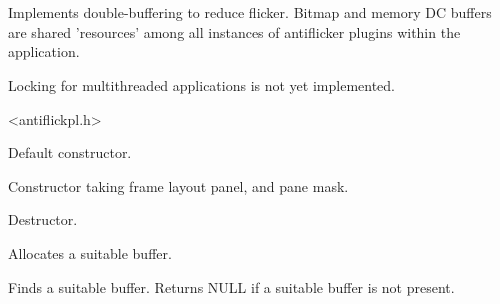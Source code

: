 %
%


\section{}\label{cbantiflickerplugin}


Implements double-buffering to reduce flicker.
Bitmap and memory DC buffers are shared 'resources' among all instances of
antiflicker plugins within the application.

Locking for multithreaded applications is not yet implemented.




<antiflickpl.h>




\label{cbantiflickerplugincbantiflickerplugin}


Default constructor.



Constructor taking frame layout panel, and pane mask.


\label{cbantiflickerplugindtor}


Destructor.


\label{cbantiflickerpluginallocnewbuffer}


Allocates a suitable buffer.


\label{cbantiflickerpluginfindsuitablebuffer}


Finds a suitable buffer. Returns NULL if a suitable buffer is not present.


